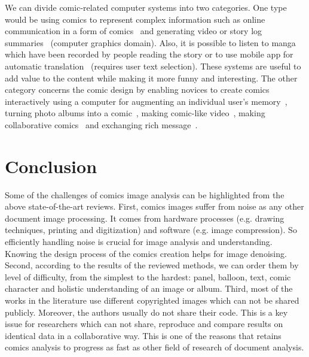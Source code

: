 We can divide comic-related computer systems into two categories.
One type would be using comics to represent complex information such as online communication in a form of comics~\cite{Kurlander1996} and generating video or story log summaries~\cite{Uchihashi1999Video,Alves2008So,Shamir2006Generating} (computer graphics domain).
Also, it is possible to listen to manga~\cite{Vomic} which have been recorded by people reading the story or to use mobile app for automatic translation~\cite{OCRMangaReader,Capture2Text} (requires user text selection).
These systems are useful to add value to the content while making it more funny and interesting.
The other category concerns the comic design by enabling novices to create comics  interactively using a computer for augmenting an individual user's memory~\cite{SumiSNM2002Comic}, turning photo albums into a comic~\cite{ComicLife3,Chu2013Optimized}, making comic-like video~\cite{Raulet2011Sketch}, making collaborative comics~\cite{Ricardo2009Calligraphic} and exchanging rich message~\cite{Salovaara2007Appropriation}.




\section{Conclusion}
\label{sec:sota:conclusion}




Some of the challenges of comics image analysis can be highlighted from the above state-of-the-art reviews.
First, comics images suffer from noise as any other document image processing.
It comes from hardware processes (e.g. drawing techniques, printing and digitization) and software (e.g. image compression).
So efficiently handling noise is crucial for image analysis and understanding.
Knowing the design process of the comics creation helps for image denoising.
Second, according to the results of the reviewed methods, we can order them by level of difficulty, from the simplest to the hardest: panel, balloon, text, comic character and holistic understanding of an image or album.
Third, most of the works in the literature use different copyrighted images which can not be shared publicly.
Moreover, the authors usually do not share their code.
This is a key issue for researchers which can not share, reproduce and compare results on identical data in a collaborative way.
This is one of the reasons that retains comics analysis to progress as fast as other field of research of document analysis.

